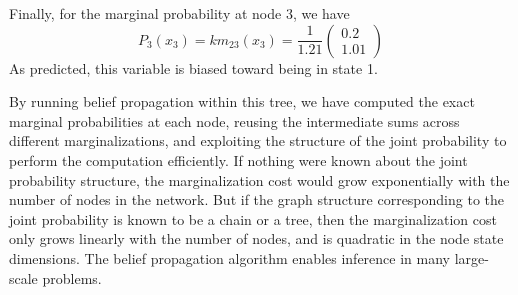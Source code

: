 Finally, for the marginal probability at node 3, we have
\begin{equation}
P_3(x_3) = k m_{23}(x_3) 
=
\frac{1}{1.21}
\left( 
\begin{array}{c}
0.2 \\
1.01
\end{array}
\right) 
\end{equation}
As predicted, this variable is biased toward being in state 1.

By running belief propagation within this tree, we have computed the
exact marginal probabilities at each node, reusing the intermediate
sums across different marginalizations, and exploiting the structure
of the joint probability to perform the computation efficiently.  If
nothing were known about the joint probability structure, the
marginalization cost would grow exponentially with the number of nodes
in the network.  But if the graph structure corresponding to the joint
probability is known to be a chain or a tree, then the marginalization
cost only grows linearly with the number of nodes, and is quadratic in
the node state dimensions.  The belief propagation algorithm enables inference in many large-scale problems.

